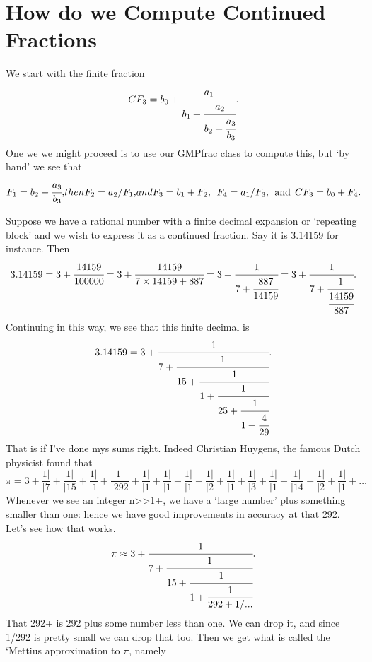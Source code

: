\documentclass[16pt]{article}
\numberwithin{equation}{section}
\numberwithin{figure}{section}
\numberwithin{figure}{section}
\numberwithin{equation}{section}
\begin{document}
\section{How do we Compute Continued Fractions}


We start with the finite fraction
\begin{equation}
CF_{3}=b_0 +\cfrac{a_1}{b_1+\cfrac{a_2}{b_2+\cfrac{a_3}{b_3}}}.
\end{equation}
One we we might proceed is to use our GMPfrac class to compute this, but `by hand' we see that
\begin{equation}
F_1=b_2+\cfrac{a_3}{b_3},
$$ then  $$
F_2 = a_2/F_1,
$$  and $$
F_3=b_1+F_2, \> \> F_4=a_1/F_3, \> \> {\rm and} \> \> CF_3=b_0+F_4.
\end{equation}

Suppose we have a rational number with a finite decimal expansion or `repeating block'
and we wish to express it as a continued fraction. Say it is 3.14159 for instance.
Then
\begin{equation}
3.14159=3+\cfrac{14159}{100000}=3+\cfrac{14159}{7\times 14159+887}
=3+\cfrac{1}{7+\cfrac{887}{14159}}=3+\cfrac{1}{ 7+\cfrac{1}{\cfrac{14159}{887}}}.
\end{equation}
Continuing in this way, we see that this finite decimal is
\begin{equation}
3.14159
=3+\cfrac{1}{ 7+ \cfrac{1}{  15+\cfrac{1}{1+\cfrac{1}{25+\cfrac{1}{1+\cfrac{4}{29} }}}}}.          
\end{equation}
That is if I've done mys sums right.
Indeed Christian Huygens, the famous Dutch physicist found that
\begin{equation}
\pi=3 +\frac{1\vert}{\vert 7}+\frac{1 \vert}{\vert 15}+\frac{1 \vert}{\vert 1}
+\frac{1 \vert}{\vert 292}+\frac{1 \vert}{\vert 1}+\frac{1 \vert}{\vert 1}+\frac{1 \vert}{\vert 1}
+\frac{1 \vert}{\vert 2}+\frac{1 \vert}{\vert 1}+\frac{1 \vert}{\vert 3}+\frac{1 \vert}{\vert 1}
+\frac{1 \vert}{\vert 14}+\frac{1 \vert}{\vert 2}+\frac{1 \vert}{\vert 1}+\ldots
\end{equation}
Whenever we see an integer n>>1+, we have a `large number' plus something smaller than one: hence
we have good improvements in accuracy at that 292. Let's see how that works.
\begin{equation}
\pi \approx
3+\cfrac{1}{ 7+ \cfrac{1}{  15+\cfrac{1}{1+\cfrac{1}{292+1/...} }}}.          
\end{equation}
That 292+ is 292 plus some number less than one. We can drop it, and since 1/292 is pretty small
we can drop that too. Then  we get what is called the `Mettius approximation to $\pi$, namely
\end{document}
